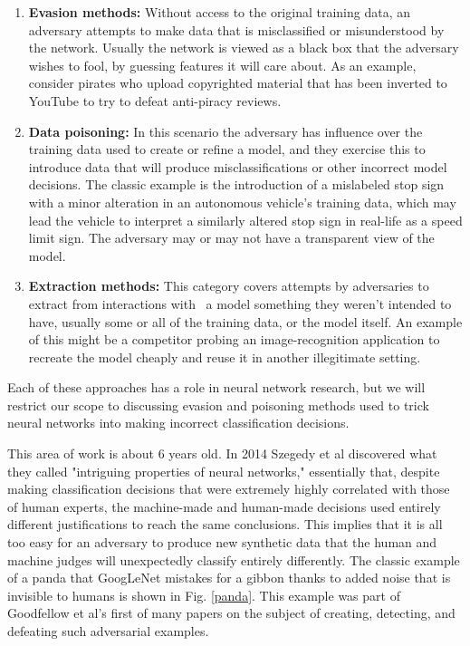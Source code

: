 \documentclass{amsproc}
\theoremstyle{definition}
\numberwithin{equation}{section}
\begin{document}
\bigskip 

\begin{enumerate}
\item \textbf{Evasion methods:} Without access to the original training
data, an adversary attempts to make data that is misclassified or
misunderstood by the network. Usually the network is viewed as a black box
that the adversary wishes to fool, by guessing features it will care about.
As an example, consider pirates who upload copyrighted material that has
been inverted to YouTube to try to defeat anti-piracy reviews.

\item \textbf{Data poisoning:} In this scenario the adversary has influence
over the training data used to create or refine a model, and they exercise
this to introduce data that will produce misclassifications or other
incorrect model decisions. The classic example is the introduction of a
mislabeled stop sign with a minor alteration in an autonomous vehicle's
training data, which may lead the vehicle to interpret a similarly altered
stop sign in real-life as a speed limit sign. The adversary may or may not
have a transparent view of the model.

\item \textbf{Extraction methods:} This category covers attempts by
adversaries to extract from interactions with \ a model something they
weren't intended to have, usually some or all of the training data, or the
model itself. An example of this might be a competitor probing an
image-recognition application to recreate the model cheaply and reuse it in
another illegitimate setting. 
\end{enumerate}

Each of these approaches has a role in neural network research, but we will
restrict our scope to discussing evasion and poisoning methods used to trick
neural networks into making incorrect classification decisions. 

This area of work is about 6 years old. In 2014 Szegedy et al discovered
what they called "intriguing properties of neural networks," essentially
that, despite making classification decisions that were extremely highly
correlated with those of human experts, the machine-made and human-made
decisions used entirely different justifications to reach the same
conclusions. This implies that it is all too easy for an adversary to
produce new synthetic data that the human and machine judges will
unexpectedly classify entirely differently. The classic example of a panda
that GoogLeNet mistakes for a gibbon thanks to added noise that is invisible
to humans is shown in Fig. \ref{panda}. This example was part of Goodfellow
et al's first of many papers \cite{goodfellow2014explaining} on the subject
of creating, detecting, and defeating such adversarial examples.
\end{document}
